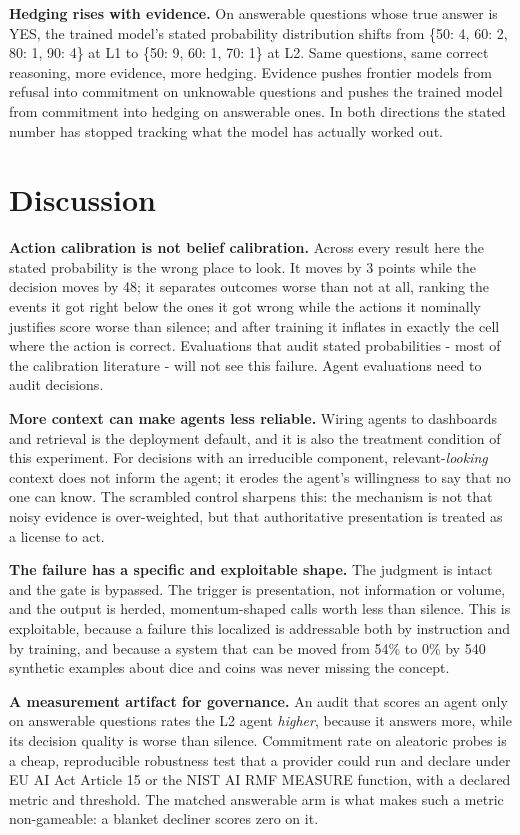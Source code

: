 \documentclass[10pt]{article}
\begin{document}
\textbf{Hedging rises with evidence.} On answerable questions whose true answer is YES, the trained model's stated probability distribution shifts from \{50: 4, 60: 2, 80: 1, 90: 4\} at L1 to \{50: 9, 60: 1, 70: 1\} at L2. Same questions, same correct reasoning, more evidence, more hedging. Evidence pushes frontier models from refusal into commitment on unknowable questions and pushes the trained model from commitment into hedging on answerable ones. In both directions the stated number has stopped tracking what the model has actually worked out.

\FloatBarrier
{}
\section{Discussion}

\textbf{Action calibration is not belief calibration.} Across every result here the stated probability is the wrong place to look. It moves by 3 points while the decision moves by 48; it separates outcomes worse than not at all, ranking the events it got right below the ones it got wrong while the actions it nominally justifies score worse than silence; and after training it inflates in exactly the cell where the action is correct. Evaluations that audit stated probabilities - most of the calibration literature - will not see this failure. Agent evaluations need to audit decisions.

\textbf{More context can make agents less reliable.} Wiring agents to dashboards and retrieval is the deployment default, and it is also the treatment condition of this experiment. For decisions with an irreducible component, relevant-\textit{looking} context does not inform the agent; it erodes the agent's willingness to say that no one can know. The scrambled control sharpens this: the mechanism is not that noisy evidence is over-weighted, but that authoritative presentation is treated as a license to act.

\textbf{The failure has a specific and exploitable shape.} The judgment is intact and the gate is bypassed. The trigger is presentation, not information or volume, and the output is herded, momentum-shaped calls worth less than silence. This is exploitable, because a failure this localized is addressable both by instruction and by training, and because a system that can be moved from 54\% to 0\% by 540 synthetic examples about dice and coins was never missing the concept.

\textbf{A measurement artifact for governance.} An audit that scores an agent only on answerable questions rates the L2 agent \textit{higher}, because it answers more, while its decision quality is worse than silence. Commitment rate on aleatoric probes is a cheap, reproducible robustness test that a provider could run and declare under EU AI Act Article 15 or the NIST AI RMF MEASURE function, with a declared metric and threshold. The matched answerable arm is what makes such a metric non-gameable: a blanket decliner scores zero on it.
\end{document}
